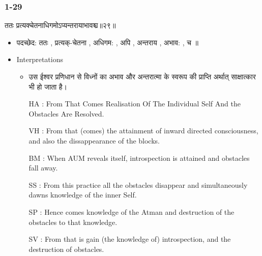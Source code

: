 \begin{frame}[fragile]\frametitle{1-29}
\begin{sanskrit}
ततः प्रत्यक्चेतनाधिगमोऽप्यन्तरायाभावश्च॥२९॥
\end{sanskrit}

	\begin{itemize}
	\item पदच्छेद: ततः , प्रत्यक्-चेतना , अधिगम: , अपि , अन्तराय , अभाव: , च ॥
	\item Interpretations
		\begin{itemize}	
		\item उस ईश्वर प्रणिधान से विध्नों का अभाव और अन्तरात्मा के स्वरूप की प्राप्ति अर्थात् साक्षात्कार भी हो जाता है।
		\item [HA]: From That Comes Realisation Of The Individual Self And the Obstacles Are Resolved.
		\item [VH]: From that (comes) the attainment of inward directed consciousness, and also the dissappearance of the blocks.
		\item [BM]: When AUM reveals itself, introspection is attained and obstacles fall away.
		\item [SS]: From this practice all the obstacles disappear and simultaneously dawns knowledge of the inner Self.
		\item [SP]: Hence comes knowledge of the Atman and destruction of the obstacles to that knowledge.
		\item [SV]: From that is gain (the knowledge of) introspection, and the destruction of obstacles. 
		\end{itemize}
	\end{itemize}
	
\end{frame}


